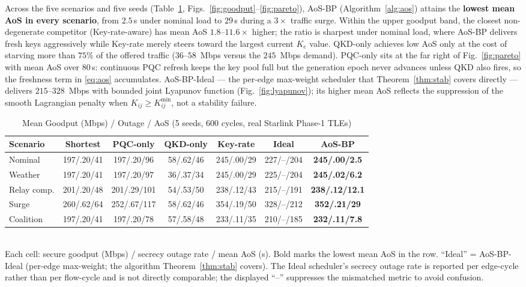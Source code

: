 \documentclass[conference]{IEEEtran}
\begin{document}
Across the five scenarios and five seeds (Table~\ref{tab:headline},
Figs.~\ref{fig:goodput}--\ref{fig:pareto}), \mbox{AoS-BP}
(Algorithm~\ref{alg:aos}) attains the \textbf{lowest mean AoS in
every scenario}, from $2.5$\,s under nominal load to $29$\,s during
a $3\times$ traffic surge.  Within the upper goodput band, the
closest non-degenerate competitor (Key-rate-aware) has mean AoS
$1.8$--$11.6\times$ higher; the ratio is sharpest under nominal
load, where AoS-BP delivers fresh keys aggressively while Key-rate
merely steers toward the largest current $K_e$ value.
\mbox{QKD-only} achieves low AoS only at the cost of starving more
than $75\%$ of the offered traffic ($36$--$58$~Mbps versus the
$245$~Mbps demand).  PQC-only sits at the far right of
Fig.~\ref{fig:pareto} with mean AoS over $80$\,s: continuous PQC
refresh keeps the key pool full but the generation epoch never
advances unless QKD also fires, so the freshness term in
\eqref{eq:aos} accumulates.  AoS-BP-Ideal --- the per-edge
max-weight scheduler that Theorem~\ref{thm:stab} covers directly
--- delivers $215$--$328$~Mbps with bounded joint Lyapunov function
(Fig.~\ref{fig:lyapunov}); its higher mean AoS reflects the
suppression of the smooth Lagrangian penalty when $K_{ij}\!\ge\!K_{ij}^{\min}$,
not a stability failure.

\begin{table}[t]
\caption{Mean Goodput (Mbps) / Outage / AoS (5 seeds, 600 cycles, real Starlink Phase-1 TLEs)}
\label{tab:headline}
\centering
\small
\setlength{\tabcolsep}{2.0pt}
\scriptsize
\begin{tabular}{lcccccc}
\toprule
Scenario & Shortest & PQC-only & QKD-only & Key-rate & Ideal & \textbf{AoS-BP} \\
\midrule
Nominal     & 197/.20/41 & 197/.20/96  & 58/.62/46 & 245/.00/29 & 227/--/204 & \textbf{245/.00/2.5} \\
Weather     & 197/.20/41 & 197/.20/97  & 36/.37/34 & 245/.00/29 & 225/--/204 & \textbf{245/.02/6.2} \\
Relay comp. & 201/.20/48 & 201/.29/101 & 54/.53/50 & 238/.12/43 & 215/--/191 & \textbf{238/.12/12.1} \\
Surge       & 260/.62/64 & 252/.67/117 & 58/.62/46 & 354/.19/50 & 328/--/212 & \textbf{352/.21/29} \\
Coalition   & 197/.20/41 & 197/.20/78  & 57/.58/48 & 233/.11/35 & 210/--/185 & \textbf{232/.11/7.8} \\
\bottomrule
\end{tabular}
\vspace{1pt}\\
{\footnotesize Each cell: secure goodput (Mbps) / secrecy outage rate /
mean AoS (s).  Bold marks the lowest mean AoS in the row.
``Ideal'' = AoS-BP-Ideal (per-edge max-weight; the algorithm
Theorem~\ref{thm:stab} covers).  The Ideal scheduler's secrecy outage
rate is reported per edge-cycle rather than per flow-cycle and is
not directly comparable; the displayed ``--'' suppresses the mismatched
metric to avoid confusion.}
\end{table}
\end{document}

